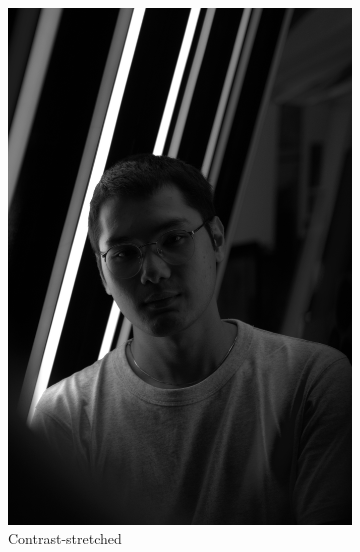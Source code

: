 \documentclass[12pt,a4paper]{article}
\begin{document}
\begin{figure}[htb]
\begin{subfigure}[h!]{0.24\textwidth}
		\includegraphics[width=\textwidth]{contrast_stretch.png}
		\caption{Contrast-stretched}
		\label{fig:cs}
	\end{subfigure}
	\begin{subfigure}[h!]{0.24\textwidth}
		\centering

\end{subfigure}
\end{figure}
\end{document}

